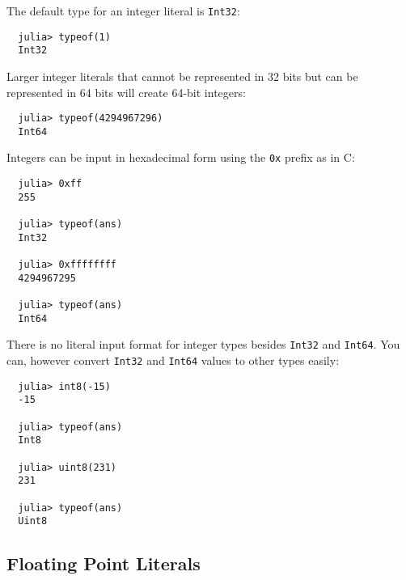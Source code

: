 \documentclass{article}
\begin{document}
The default type for an integer literal is \verb|Int32|:
\begin{verbatim}
  julia> typeof(1)
  Int32
\end{verbatim}
Larger integer literals that cannot be represented in 32 bits but can be represented in 64 bits will create 64-bit integers:
\begin{verbatim}
  julia> typeof(4294967296)
  Int64
\end{verbatim}
Integers can be input in hexadecimal form using the \verb|0x| prefix as in C:
\begin{verbatim}
  julia> 0xff
  255

  julia> typeof(ans)
  Int32

  julia> 0xffffffff
  4294967295

  julia> typeof(ans)
  Int64
\end{verbatim}
There is no literal input format for integer types besides \verb|Int32| and \verb|Int64|. You can, however convert \verb|Int32| and \verb|Int64| values to other types easily:
\begin{verbatim}
  julia> int8(-15)
  -15

  julia> typeof(ans)
  Int8

  julia> uint8(231)
  231

  julia> typeof(ans)
  Uint8
\end{verbatim}

\subsection{Floating Point Literals}
\end{document}
